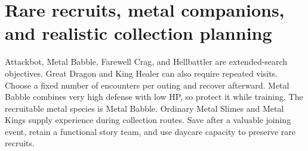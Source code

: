 \section{Rare recruits, metal companions, and realistic collection planning}
Attackbot, Metal Babble, Farewell Crag, and Hellbattler are extended-search
objectives. Great Dragon and King Healer can also require repeated visits.
Choose a fixed number of encounters per outing and recover afterward.
Metal Babble combines very high defense with low HP, so protect it while
training. The recruitable metal species is Metal Babble. Ordinary Metal Slimes
and Metal Kings supply experience during collection routes. Save after a valuable joining event,
retain a functional story team, and use daycare capacity to preserve rare recruits.

